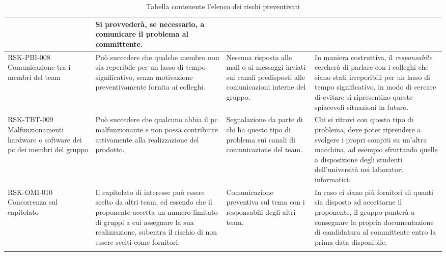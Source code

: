 \begin{center}
\begin{longtable}{|p{3cm}|p{4cm}|p{3.5cm}|p{3.5cm}|}
	& Si provvederà, se necessario, a comunicare il problema al committente.  \\
	\hline
	
		\hline
	RSK-PBI-008 \newline Comunicazione tra i membri del team
	 & 
	Può succedere che qualche membro non sia reperibile per un lasso di tempo significativo, senza motivazione preventivamente fornita ai colleghi.
	&   

	Nessuna risposta alle mail o ai messaggi inviati sui canali predisposti alle comunicazioni interne del gruppo.
	 
	& In maniera costruttiva, il \textit{responsabile}
	   cercherà di parlare con i colleghi che siano stati irreperibili per un lasso di tempo significativo, in modo di cercare di evitare si ripresentino queste spiacevoli situazioni in futuro. \\
	\hline
	
			\hline
	RSK-TBT-009 \newline Malfunzionamenti hardware o software dei pc dei membri del gruppo
	 & 
	Può succedere che qualcuno abbia il pc malfunzionante e non possa contribuire attivamente alla realizzazione del prodotto.
	&   

	Segnalazione da parte di chi ha questo tipo di problema sui canali di comunicazione del team.
	 
	& Chi si ritrovi con questo tipo di problema, deve poter riprendere a svolgere i propri compiti su un'altra macchina, ad esempio sfruttando quelle a disposizione degli studenti dell'università nei laboratori informatici. \\
	\hline
	
	
				\hline
	RSK-OMI-010 \newline Concorrenza sul capitolato
	 & 
	Il capitolato di interesse può essere scelto da altri team, ed essendo che il proponente accetta un numero limitato di gruppi a cui assegnare la sua realizzazione, subentra il rischio di non essere scelti come fornitori.
	&   

	Comunicazione preventiva sul tema con i responsabili degli altri team.
	 
	& In caso ci siano più fornitori di quanti sia disposto ad accettarne il proponente, il gruppo punterà a consegnare la propria documentazione di candidatura al committente entro la prima data disponibile. \\
	\hline
	
		\caption{Tabella contenente l'elenco dei rischi preventivati}
	\end{longtable}

\end{center}
